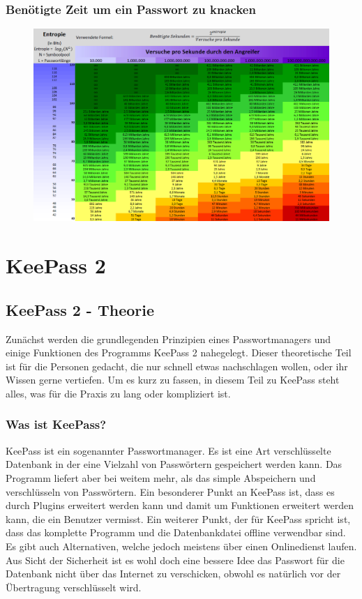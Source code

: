 \documentclass[12pt,a4paper]{scrreprt}
\begin{document}
\section{Benötigte Zeit um ein Passwort zu knacken}
\begin{figure}[h]
\begin{center}
\includegraphics[width=480pt]{media/entropytable.png}
\label{entropytable}
\end{center}
\end{figure}

\part{KeePass 2}
\chapter{KeePass 2 - Theorie}
Zunächst werden die grundlegenden Prinzipien eines Passwortmanagers und einige Funktionen des Programms KeePass 2 nahegelegt. Dieser theoretische Teil ist für die Personen gedacht, die nur schnell etwas nachschlagen wollen, oder ihr Wissen gerne vertiefen. Um es kurz zu fassen, in diesem Teil zu KeePass steht alles, was für die Praxis zu lang oder kompliziert ist.

\section{Was ist KeePass?}
KeePass ist ein sogenannter Passwortmanager. Es ist eine Art verschlüsselte Datenbank in der eine Vielzahl von Passwörtern gespeichert werden kann. Das Programm liefert aber bei weitem mehr, als das simple Abspeichern und verschlüsseln von Passwörtern. Ein besonderer Punkt an KeePass ist, dass es durch Plugins erweitert werden kann und damit um Funktionen erweitert werden kann, die ein Benutzer vermisst. Ein weiterer Punkt, der für KeePass spricht ist, dass das komplette Programm und die Datenbankdatei offline verwendbar sind. Es gibt auch Alternativen, welche jedoch meistens über einen Onlinedienst laufen. Aus Sicht der Sicherheit ist es wohl doch eine bessere Idee das Passwort für die Datenbank nicht über das Internet zu verschicken, obwohl es natürlich vor der Übertragung verschlüsselt wird.
\end{document}
